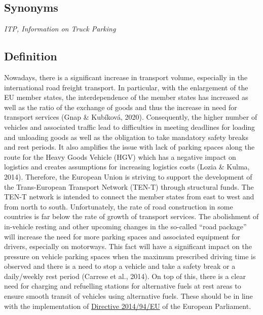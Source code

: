 \documentclass[
]{book}
\begin{document}
\hypertarget{synonyms-15}{%
\subsection*{Synonyms}\label{synonyms-15}}

\emph{ITP, Information on Truck Parking}

\hypertarget{definition-17}{%
\subsection*{Definition}\label{definition-17}}

Nowadays, there is a significant increase in transport volume, especially in the international road freight transport. In particular, with the enlargement of the EU member states, the interdependence of the member states has increased as well as the ratio of the exchange of goods and thus the increase in need for transport services (Gnap \& Kubíková, 2020). Consequently, the higher number of vehicles and associated traffic lead to difficulties in meeting deadlines for loading and unloading goods as well as the obligation to take mandatory safety breaks and rest periods. It also amplifies the issue with lack of parking spaces along the route for the Heavy Goods Vehicle (HGV) which has a negative impact on logistics and creates assumptions for increasing logistics costs (Lozia \& Kulma, 2014).
Therefore, the European Union is striving to support the development of the Trans-European Transport Network (TEN-T) through structural funds. The TEN-T network is intended to connect the member states from east to west and from north to south. Unfortunately, the rate of road construction in some countries is far below the rate of growth of transport services. The abolishment of in-vehicle resting and other upcoming changes in the so-called ``road package'' will increase the need for more parking spaces and associated equipment for drivers, especially on motorways. This fact will have a significant impact on the pressure on vehicle parking spaces when the maximum prescribed driving time is observed and there is a need to stop a vehicle and take a safety break or a daily/weekly rest period (Carrese et al., 2014). On top of this, there is a clear need for charging and refuelling stations for alternative fuels at rest areas to ensure smooth transit of vehicles using alternative fuels. These should be in line with the implementation of \href{https://eur-lex.europa.eu/legal-content/en/TXT/?uri=CELEX\%3A32014L0094}{Directive 2014/94/EU} of the European Parliament.
\end{document}
